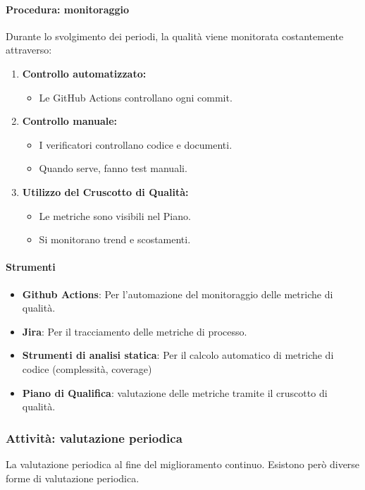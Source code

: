 \documentclass[a4paper,12pt]{article}
\begin{document}
\paragraph{Procedura: monitoraggio}
Durante lo svolgimento dei periodi, la qualità viene monitorata costantemente
attraverso:
\begin{enumerate}
    \item \textbf{Controllo automatizzato:}
          \begin{itemize}
              \item Le GitHub Actions controllano ogni commit.
          \end{itemize}
    \item \textbf{Controllo manuale:}
          \begin{itemize}
              \item I verificatori controllano codice e documenti.
              \item Quando serve, fanno test manuali.
          \end{itemize}
    \item \textbf{Utilizzo del Cruscotto di Qualità:}
          \begin{itemize}
              \item Le metriche sono visibili nel Piano.
              \item Si monitorano trend e scostamenti.
          \end{itemize}
\end{enumerate}

\paragraph{Strumenti}
\begin{itemize}
    \item \textbf{Github Actions}: Per l'automazione del monitoraggio delle metriche di qualità.
    \item \textbf{Jira}: Per il tracciamento delle metriche di processo.
    \item \textbf{Strumenti di analisi statica}: Per il calcolo automatico di metriche di codice (complessità, coverage)
    \item \textbf{Piano di Qualifica}: valutazione delle metriche tramite il cruscotto di qualità.
\end{itemize}

\subsubsection{Attività: valutazione periodica}\label{valutazione_periodica}
La valutazione periodica al fine del miglioramento continuo. Esistono però
diverse forme di valutazione periodica.
\end{document}
